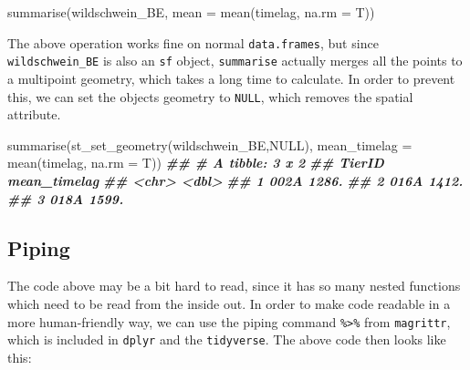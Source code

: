 \documentclass[
]{book}
\newenvironment{Shaded}{\begin{snugshade}}{\end{snugshade}}
\newcommand{\AttributeTok}[1]{\textcolor[rgb]{0.77,0.63,0.00}{#1}}
\newcommand{\ConstantTok}[1]{\textcolor[rgb]{0.00,0.00,0.00}{#1}}
\newcommand{\DocumentationTok}[1]{\textcolor[rgb]{0.56,0.35,0.01}{\textbf{\textit{#1}}}}
\newcommand{\FunctionTok}[1]{\textcolor[rgb]{0.00,0.00,0.00}{#1}}
\newcommand{\NormalTok}[1]{#1}
\begin{document}
\begin{Shaded}
\begin{Highlighting}[]
\FunctionTok{summarise}\NormalTok{(wildschwein\_BE, }\AttributeTok{mean =} \FunctionTok{mean}\NormalTok{(timelag, }\AttributeTok{na.rm =}\NormalTok{ T))}
\end{Highlighting}
\end{Shaded}

The above operation works fine on normal \texttt{data.frames}, but since \texttt{wildschwein\_BE} is also an \texttt{sf} object, \texttt{summarise} actually merges all the points to a multipoint geometry, which takes a long time to calculate. In order to prevent this, we can set the objects geometry to \texttt{NULL}, which removes the spatial attribute.

\begin{Shaded}
\begin{Highlighting}[]

\FunctionTok{summarise}\NormalTok{(}\FunctionTok{st\_set\_geometry}\NormalTok{(wildschwein\_BE,}\ConstantTok{NULL}\NormalTok{), }\AttributeTok{mean\_timelag =} \FunctionTok{mean}\NormalTok{(timelag, }\AttributeTok{na.rm =}\NormalTok{ T))}
\DocumentationTok{\#\# \# A tibble: 3 x 2}
\DocumentationTok{\#\#   TierID mean\_timelag}
\DocumentationTok{\#\#   \textless{}chr\textgreater{}         \textless{}dbl\textgreater{}}
\DocumentationTok{\#\# 1 002A          1286.}
\DocumentationTok{\#\# 2 016A          1412.}
\DocumentationTok{\#\# 3 018A          1599.}
\end{Highlighting}
\end{Shaded}

\hypertarget{piping}{%
\subsection{Piping}\label{piping}}

The code above may be a bit hard to read, since it has so many nested functions which need to be read from the inside out. In order to make code readable in a more human-friendly way, we can use the piping command \texttt{\%\textgreater{}\%} from \texttt{magrittr}, which is included in \texttt{dplyr} and the \texttt{tidyverse}. The above code then looks like this:
\end{document}
